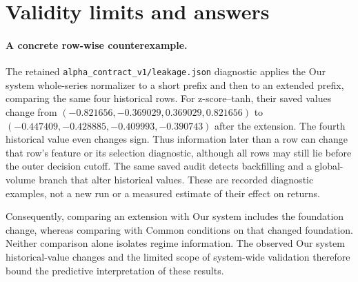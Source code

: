 \section{Validity limits and answers}\label{s:7abb5e08a08c44da}
\begingroup\raggedright
\paragraph{A concrete row-wise counterexample.}
The retained \texttt{alpha\_contract\_v1/leakage.json} diagnostic applies
the Our system whole-series normalizer to a short prefix and then to an
extended prefix, comparing the same four historical rows. For
z-score--tanh, their saved values change from
$(-0.821656,-0.369029,0.369029,0.821656)$ to
$(-0.447409,-0.428885,-0.409993,-0.390743)$ after the extension.
The fourth historical value even changes sign. Thus information later
than a row can change that row's feature or its selection diagnostic,
although all rows may still lie before the outer decision cutoff.
The same saved audit detects backfilling and a global-volume branch
that alter historical values. These are recorded diagnostic examples,
not a new run or a measured estimate of their effect on returns.\par
\endgroup

Consequently, comparing an extension with Our system includes the foundation
change, whereas comparing with Common conditions on that changed
foundation. Neither comparison alone isolates regime information. The
observed Our system historical-value changes and the limited scope of
system-wide validation therefore bound the predictive interpretation
of these results.

